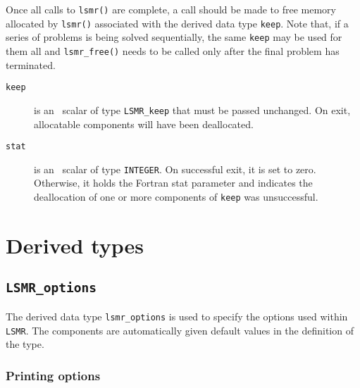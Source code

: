 \noindent
Once all  calls to \texttt{lsmr()} are complete,
a call should be made to free memory  allocated by
\texttt{lsmr()}  associated with the derived data type {\tt keep}.
Note that, if a series of problems is being solved sequentially, the same {\tt keep}
may be used for them all and {\tt lsmr\_free()} needs to be called only
after the final problem has terminated.

\begin{description}

\item[\texttt{keep}] is an \intentinout\ scalar  of type {\tt LSMR\_keep}
that must be passed unchanged.
On exit, allocatable components will have been deallocated.

\item[\texttt{stat}] is an \intentout\ scalar of type {\tt INTEGER}.
On successful exit, it is set to zero. Otherwise, it holds the Fortran stat
parameter and indicates the deallocation of one or more components of
{\tt keep} was unsuccessful.

\end{description}




\section{Derived types}
\subsection{\texttt{LSMR\_options}}
\label{LSMR:type:options}

The derived data type {\tt lsmr\_options} is used to specify the options used
within \texttt{LSMR}. The components are automatically
given default values in the definition of the type.

\subsubsection*{Printing options}

